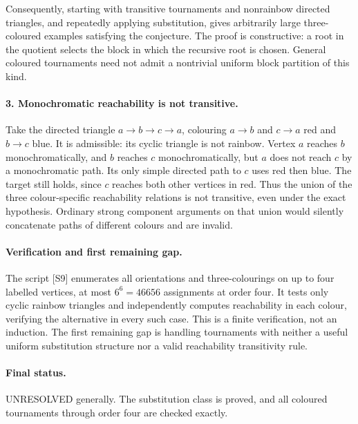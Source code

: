 \documentclass[11pt,a4paper]{article}
\begin{document}
Consequently, starting with transitive tournaments and nonrainbow
directed triangles, and repeatedly applying substitution, gives
arbitrarily large three-coloured examples satisfying the conjecture.
The proof is constructive: a root in the quotient selects the block
in which the recursive root is chosen. General coloured tournaments
need not admit a nontrivial uniform block partition of this kind.

\paragraph{3. Monochromatic reachability is not transitive.}
Take the directed triangle
$a\to b\to c\to a$, colouring $a\to b$ and $c\to a$ red
and $b\to c$ blue. It is admissible: its cyclic triangle is not
rainbow. Vertex $a$ reaches $b$ monochromatically, and $b$ reaches
$c$ monochromatically, but $a$ does not reach $c$ by a monochromatic
path. Its only simple directed path to $c$ uses red then blue.
The target still holds, since $c$ reaches both other vertices in red.
Thus the union of the three colour-specific reachability relations
is not transitive, even under the exact hypothesis. Ordinary strong
component arguments on that union would silently concatenate paths
of different colours and are invalid.

\paragraph{Verification and first remaining gap.}
The script [S9] enumerates all orientations and three-colourings
on up to four labelled vertices, at most $6^6=46656$ assignments
at order four. It tests only cyclic rainbow triangles and independently
computes reachability in each colour, verifying the alternative in
every such case. This is a finite verification, not an induction.
The first remaining gap is handling tournaments with neither a
useful uniform substitution structure nor a valid reachability
transitivity rule.

\paragraph{Final status.}
UNRESOLVED generally. The substitution class is proved, and all
coloured tournaments through order four are checked exactly.
\end{document}
